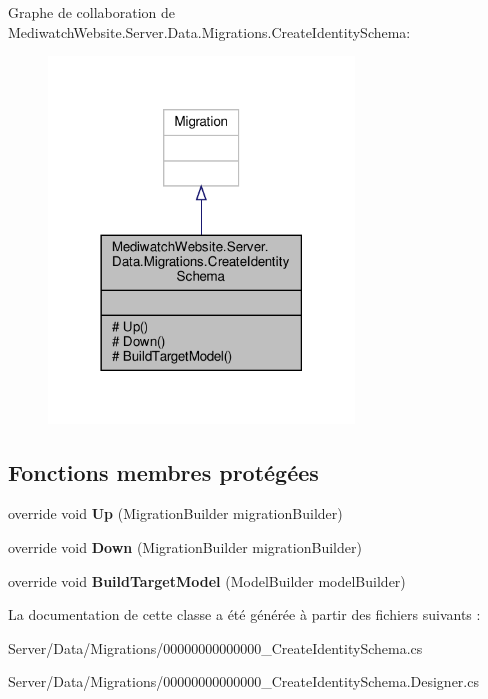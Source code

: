 Graphe de collaboration de Mediwatch\+Website.\+Server.\+Data.\+Migrations.\+Create\+Identity\+Schema\+:\nopagebreak
\begin{figure}[H]
\begin{center}
\leavevmode
\includegraphics[width=230pt]{class_mediwatch_website_1_1_server_1_1_data_1_1_migrations_1_1_create_identity_schema__coll__graph}
\end{center}
\end{figure}
\subsection*{Fonctions membres protégées}
\begin{DoxyCompactItemize}
\item 
\mbox{\label{class_mediwatch_website_1_1_server_1_1_data_1_1_migrations_1_1_create_identity_schema_a8463d6d116a90f1f018b9f8ed60e272a}} 
override void {\bfseries Up} (Migration\+Builder migration\+Builder)
\item 
\mbox{\label{class_mediwatch_website_1_1_server_1_1_data_1_1_migrations_1_1_create_identity_schema_adc803467f0ad34f65738416b12b557b7}} 
override void {\bfseries Down} (Migration\+Builder migration\+Builder)
\item 
\mbox{\label{class_mediwatch_website_1_1_server_1_1_data_1_1_migrations_1_1_create_identity_schema_ae325d871e065f081fc9eada037994d7f}} 
override void {\bfseries Build\+Target\+Model} (Model\+Builder model\+Builder)
\end{DoxyCompactItemize}


La documentation de cette classe a été générée à partir des fichiers suivants \+:\begin{DoxyCompactItemize}
\item 
Server/\+Data/\+Migrations/00000000000000\+\_\+\+Create\+Identity\+Schema.\+cs\item 
Server/\+Data/\+Migrations/00000000000000\+\_\+\+Create\+Identity\+Schema.\+Designer.\+cs\end{DoxyCompactItemize}
